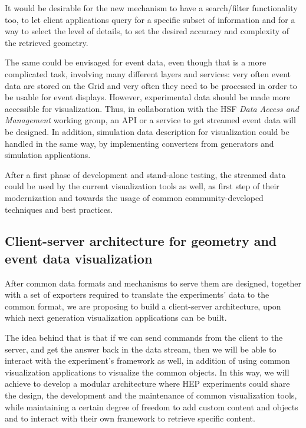 \documentclass[12pt,a4paper]{article}
\begin{document}
It would be desirable for the new mechanism to have a search/filter functionality too, to let client applications query for a specific
subset of information and for a way to select the level of details, to set the desired accuracy and complexity of the retrieved geometry.

The same could be envisaged for event data, even though that is a more complicated task, involving many different layers and services:
very often event data are stored on the Grid and very often they need to be processed in order to be usable for event displays.
However, experimental data should be made more accessible for visualization. Thus, in collaboration with
the HSF \textit{Data Access and Management} working group, an API or a service to get streamed event data will be designed.
In addition, simulation data description for visualization could be handled in the same way, by implementing converters from
generators and simulation applications.

After a first phase of development and stand-alone testing, the streamed data could be used by the current visualization tools as well,
as first step of their modernization and towards the usage of common community-developed techniques and best practices.

\hypertarget{client-server}{%
\subsection{Client-server architecture for geometry and event data visualization}\label{client-server}}

After common data formats and mechanisms to serve them are designed, together with a set of exporters required to translate the experiments’
data to the common format, we are proposing to build a client-server architecture, upon which next generation visualization applications can be built.

The idea behind that is that if we can send commands from the client to the server, and get the answer back in the data stream, then
we will be able to interact with the experiment’s framework as well, in addition of using common visualization applications to visualize
the common objects. In this way, we will achieve to develop a modular architecture where HEP experiments could share the design, the
development and the maintenance of common visualization tools, while maintaining a certain degree of freedom to add custom content
and objects and to interact with their own framework to retrieve specific content.
\end{document}
